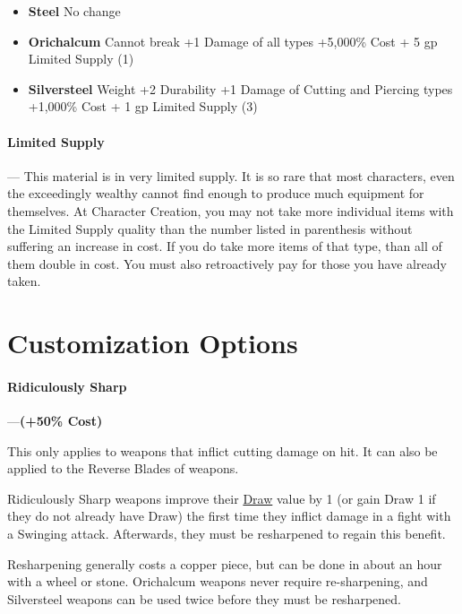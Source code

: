 \documentclass[oneside,11pt,english]{book}
\begin{document}
\begin{itemize}
\item [] \textbf{Steel}
\subitem No change
\end{itemize}
\begin{itemize}
\item [] \textbf{Orichalcum}
\subitem Cannot break
\subitem +1 Damage of all types
\subitem +5,000\% Cost + 5 gp
\subitem Limited Supply (1)
\end{itemize}
\begin{itemize}
\item [] \textbf{Silversteel}
 Weight
\subitem +2 Durability
\subitem +1 Damage of Cutting and Piercing types
\subitem +1,000\% Cost + 1 gp
\subitem Limited Supply (3)
\end{itemize}
\paragraph{Limited Supply}--- \quad
 This material is in very limited supply. It is so rare that most characters, even the exceedingly wealthy cannot find enough to produce much equipment for themselves. At Character Creation, you may not take more individual items with the Limited Supply quality than the number listed in parenthesis without suffering an increase in cost. If you do take more items of that type, than all of them double in cost. You must also retroactively pay for those you have already taken.

\section{Customization Options}
\paragraph{\label{par:Ridiculously Sharp}Ridiculously Sharp}---\quad \textbf{(+50\% Cost)}\par
This only applies to weapons that inflict cutting damage on hit. It can also be applied to the Reverse Blades of weapons.

Ridiculously Sharp weapons improve their \hyperref[par:Draw]{Draw} value by 1 (or gain Draw 1 if they do not already have Draw) the first time they inflict damage in a fight with a Swinging attack. Afterwards, they must be resharpened to regain this benefit.

Resharpening generally costs a copper piece, but can be done in about an hour with a wheel or stone. Orichalcum weapons never require re-sharpening, and Silversteel weapons can be used twice before they must be resharpened.
\end{document}
